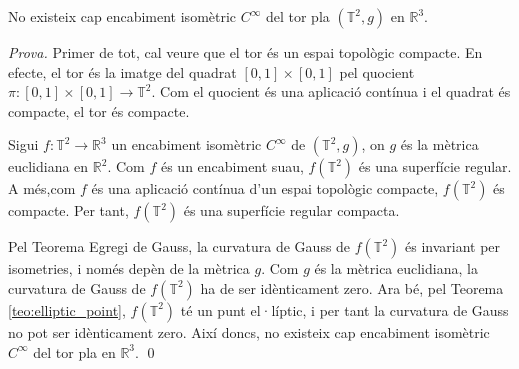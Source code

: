 \begin{teo}
    No existeix cap encabiment isomètric $C^\infty$ del tor pla $(\mathbb T^2, g)$ en $\mathbb R^3$.
\end{teo}
{
    \color{black}
    \textit{Prova.}
    Primer de tot, cal veure que el tor és un espai topològic compacte. En efecte, el tor és la imatge del quadrat $[0,1]\times[0,1]$ pel quocient $\pi:[0,1]\times[0,1]\to\mathbb T^2$. Com el quocient és una aplicació contínua i el quadrat és compacte, el tor és compacte.

    Sigui $f:\mathbb T^2\to\mathbb R^3$ un encabiment isomètric $C^\infty$ de $(\mathbb T^2, g)$, on $g$ és la mètrica euclidiana en $\mathbb R^2$. Com $f$ és un encabiment suau, $f(\mathbb T^2)$ és una superfície regular. A més,com $f$ és una aplicació contínua d'un espai topològic compacte, $f(\mathbb T^2)$ és compacte. Per tant, $f(\mathbb T^2)$ és una superfície regular compacta.

    Pel Teorema Egregi de Gauss, la curvatura de Gauss de $f(\mathbb T^2)$ és invariant per isometries, i només depèn de la mètrica $g$. Com $g$ és la mètrica euclidiana, la curvatura de Gauss de $f(\mathbb T^2)$ ha de ser idènticament zero. Ara bé, pel Teorema \ref{teo:elliptic_point}, $f(\mathbb T^2)$ té un punt el·líptic, i per tant la curvatura de Gauss no pot ser idènticament zero. Així doncs, no existeix cap encabiment isomètric $C^\infty$ del tor pla en $\mathbb R^3$.
    \qed
}



\newpage